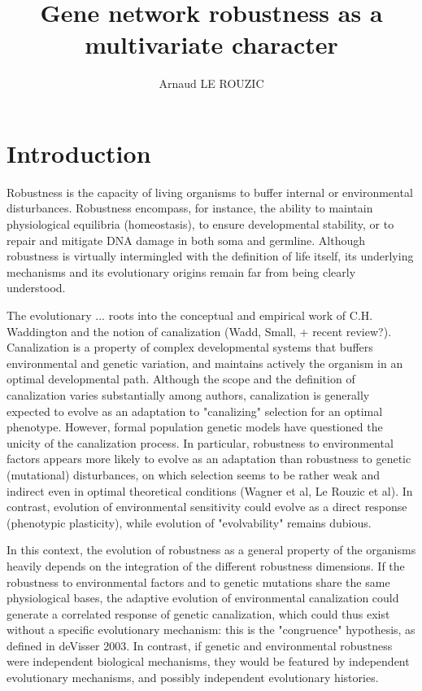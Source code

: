 \documentclass{article}
\title{Gene network robustness as a multivariate character}
\author{Arnaud LE ROUZIC}
\date{}
\begin{document}
\maketitle

\section{Introduction}

Robustness is the capacity of living organisms to buffer internal or environmental disturbances. Robustness encompass, for instance, the ability to maintain physiological equilibria (homeostasis), to ensure developmental stability, or to repair and mitigate DNA damage in both soma and germline. Although robustness is virtually intermingled with the definition of life itself, its underlying mechanisms and its evolutionary origins remain far from being clearly understood. 

The evolutionary ... roots into the conceptual and empirical work of C.H. Waddington and the notion of canalization (Wadd, Small, + recent review?). Canalization is a property of complex developmental systems that buffers environmental and genetic variation, and maintains actively the organism in an optimal developmental path. Although the scope and the definition of canalization varies substantially among authors, canalization is generally expected to evolve as an adaptation to "canalizing" selection for an optimal phenotype. However, formal population genetic models have questioned the unicity of the canalization process. In particular, robustness to environmental factors appears more likely to evolve as an adaptation than robustness to genetic (mutational) disturbances, on which selection seems to be rather weak and indirect even in optimal theoretical conditions (Wagner et al, Le Rouzic et al). In contrast, evolution of environmental sensitivity could evolve as a direct response (phenotypic plasticity), while evolution of "evolvability" remains dubious. 

In this context, the evolution of robustness as a general property of the organisms heavily depends on the integration of the different robustness dimensions. If the robustness to environmental factors and to genetic mutations share the same physiological bases, the adaptive evolution of environmental canalization could generate a correlated response of genetic canalization, which could thus exist without a specific evolutionary mechanism: this is the "congruence" hypothesis, as defined in deVisser 2003. In contrast, if genetic and environmental robustness were independent biological mechanisms, they would be featured by independent evolutionary mechanisms, and possibly independent evolutionary histories. 
\end{document}
